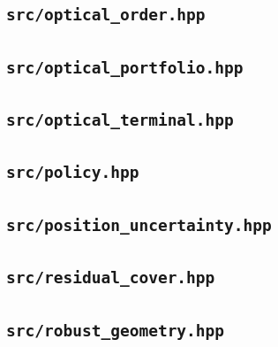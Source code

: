 \subsection*{\texttt{src/optical\_order.hpp}}

\subsection*{\texttt{src/optical\_portfolio.hpp}}

\subsection*{\texttt{src/optical\_terminal.hpp}}

\subsection*{\texttt{src/policy.hpp}}

\subsection*{\texttt{src/position\_uncertainty.hpp}}

\subsection*{\texttt{src/residual\_cover.hpp}}

\subsection*{\texttt{src/robust\_geometry.hpp}}

